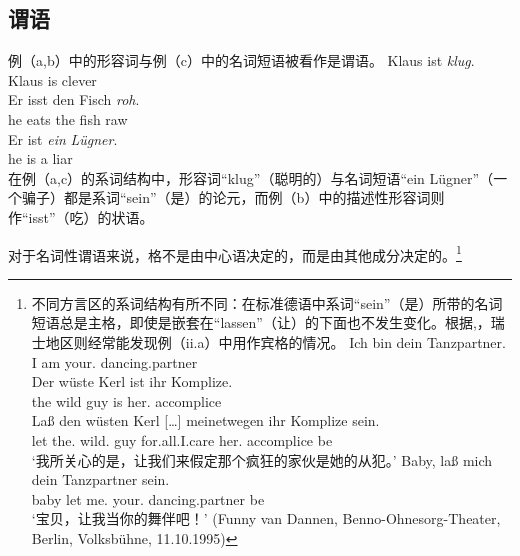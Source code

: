 \subsection{谓语}
例（a,b）中的形容词与例（c）中的名词短语被看作是谓语。
\eal
\ex 
\gll Klaus ist \emph{klug}.\\
	 Klaus is clever\\
\ex 
\gll Er isst den Fisch \emph{roh}.\\
	 he eats the fish raw\\
\ex 
\gll Er ist \emph{ein} \emph{Lügner}.\\
     he is a liar\\
\zl
在例（a,c）的系词结构中，形容词“klug”（聪明的）与名词短语“ein Lügner”（一个骗子）都是系词“sein”（是）的论元，而例（b）中的描述性形容词则作“isst”（吃）的状语。

对于名词性谓语来说，格不是由中心语决定的，而是由其他成分决定的。\footnote{不同方言区的系词结构有所不同：在标准德语中系词“sein”（是）所带的名词短语总是主格，即使是嵌套在“lassen”（让）的下面也不发生变化。根据\citet*[{\S}\,1259]{Duden95-Authors},，瑞士地区则经常能发现例（ii.a）中用作宾格的情况。
	\eal
\ex 
\gll Ich bin dein Tanzpartner.\\
     I am your.\nom{} dancing.partner\\
\ex 
\gll Der wüste Kerl ist ihr Komplize.\\
     the wild  guy  is  her.\nom{} accomplice\\
\ex 
\gll Laß den wüsten Kerl [\ldots] meinetwegen ihr Komplize sein.\\
     let the.\acc{} wild.\acc{} guy {} for.all.I.care her.\nom{} accomplice be\\
\glt `我所关心的是，让我们来假定那个疯狂的家伙是她的从犯。'  \citep*[{\S}\,6925]{Duden66-Authors}
\ex 
\gll Baby, laß mich dein Tanzpartner sein.\\
     baby let me.\acc{} your.\nom{} dancing.partner be\\
\glt `宝贝，让我当你的舞伴吧！'  (Funny van Dannen, Benno-Ohnesorg-Theater, Berlin, Volksbühne, 11.10.1995)
\zl

        \eal
        \zllast}
        
